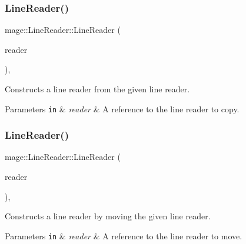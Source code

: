 \subsubsection{\texorpdfstring{Line\+Reader()}{LineReader()}\hspace{0.1cm}{\footnotesize\ttfamily [2/3]}}
{\footnotesize\ttfamily mage\+::\+Line\+Reader\+::\+Line\+Reader (\begin{DoxyParamCaption}\item[{const \mbox{\hyperlink{classmage_1_1_line_reader}{Line\+Reader}} \&}]{reader }\end{DoxyParamCaption})\hspace{0.3cm}{\ttfamily [protected]}, {\ttfamily [delete]}}

Constructs a line reader from the given line reader.


\begin{DoxyParams}[1]{Parameters}
\mbox{\tt in}  & {\em reader} & A reference to the line reader to copy. \\
\hline
\end{DoxyParams}
\mbox{\label{classmage_1_1_line_reader_ae90c546a98e113a48ca1c94b854a4866}} 
\subsubsection{\texorpdfstring{Line\+Reader()}{LineReader()}\hspace{0.1cm}{\footnotesize\ttfamily [3/3]}}
{\footnotesize\ttfamily mage\+::\+Line\+Reader\+::\+Line\+Reader (\begin{DoxyParamCaption}\item[{\mbox{\hyperlink{classmage_1_1_line_reader}{Line\+Reader}} \&\&}]{reader }\end{DoxyParamCaption})\hspace{0.3cm}{\ttfamily [protected]}, {\ttfamily [noexcept]}}

Constructs a line reader by moving the given line reader.


\begin{DoxyParams}[1]{Parameters}
\mbox{\tt in}  & {\em reader} & A reference to the line reader to move. \\
\hline
\end{DoxyParams}
\mbox{\label{classmage_1_1_line_reader_ad9753ea392ebe5b3867852d3392fb1e7}} 
